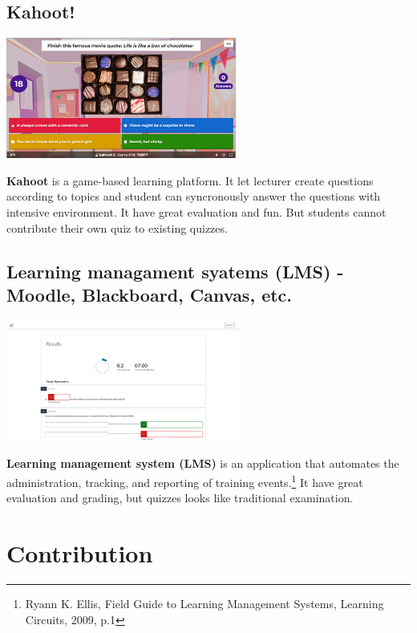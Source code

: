 \documentclass[a4paper, 12pt]{report}
\begin{document}
    
    \subsection*{Kahoot!}
    \begin{center}
        \includegraphics[height=150px]{kahoot.png}
    \end{center}
    
    \textbf{Kahoot} is a game-based learning platform. It let lecturer create questions according to topics and student can syncronously answer the questions with intensive environment. It have great evaluation and fun. But students cannot contribute their own quiz to existing quizzes.

    \subsection*{Learning managament syatems (LMS) - Moodle, Blackboard, Canvas, etc.}
    \begin{center}
        \includegraphics[height=150px]{LMS.png}
    \end{center}

    \textbf{Learning management system (LMS)} is an application that automates the administration, tracking, and reporting of training events.\footnote{Ryann K. Ellis, Field Guide to Learning Management Systems, Learning Circuits, 2009, p.1} It have great evaluation and grading, but quizzes looks like traditional examination.

    \pagebreak
    \section*{Contribution}
\end{document}
